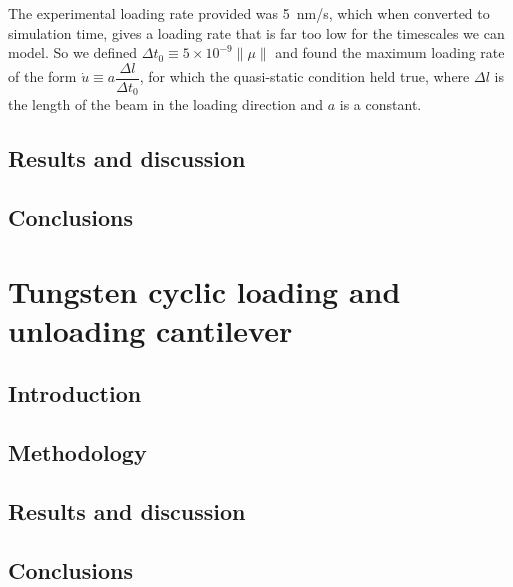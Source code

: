 The experimental loading rate provided was \SI{5}{\nano\metre/\second}, which when converted to simulation time, gives a loading rate that is far too low for the timescales we can model. So we defined $\Delta t_0 \equiv 5\times 10^{-9} \lVert\mu\rVert$ and found the maximum loading rate of the form $\dot{u} \equiv a \dfrac{\Delta l}{\Delta t_0}$, for which the quasi-static condition held true, where $\Delta l$ is the length of the beam in the loading direction and $a$ is a constant.






\subsection{Results and discussion}
\subsection{Conclusions}

\section{Tungsten cyclic loading and unloading cantilever}\label{s:tungstenCyclic}
\subsection{Introduction}
\subsection{Methodology}
\subsection{Results and discussion}
\subsection{Conclusions}

